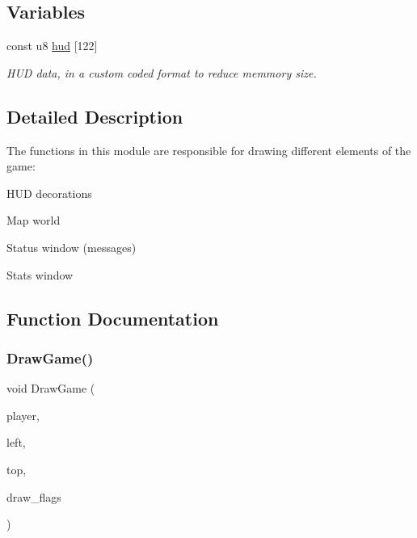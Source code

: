 \subsection*{Variables}
\begin{DoxyCompactItemize}
\item 
const u8 \mbox{\hyperlink{group__user__interface_gaec0e6bac325752e9bc0a41d772670bd9}{hud}} \mbox{[}122\mbox{]}
\begin{DoxyCompactList}\small\item\em H\+UD data, in a custom coded format to reduce memmory size. \end{DoxyCompactList}\end{DoxyCompactItemize}


\subsection{Detailed Description}
The functions in this module are responsible for drawing different elements of the game\+:


\begin{DoxyItemize}
\item H\+UD decorations
\item Map world
\item Status window (messages)
\item Stats window 
\end{DoxyItemize}

\subsection{Function Documentation}
\mbox{\label{group__user__interface_gaf665342055aea2d01fc6375b38c8b4df}} 
\subsubsection{\texorpdfstring{DrawGame()}{DrawGame()}}
{\footnotesize\ttfamily void Draw\+Game (\begin{DoxyParamCaption}\item[{\mbox{\hyperlink{structTEntity}{T\+Entity}} $\ast$}]{player,  }\item[{u8}]{left,  }\item[{u8}]{top,  }\item[{u8}]{draw\+\_\+flags }\end{DoxyParamCaption})}

